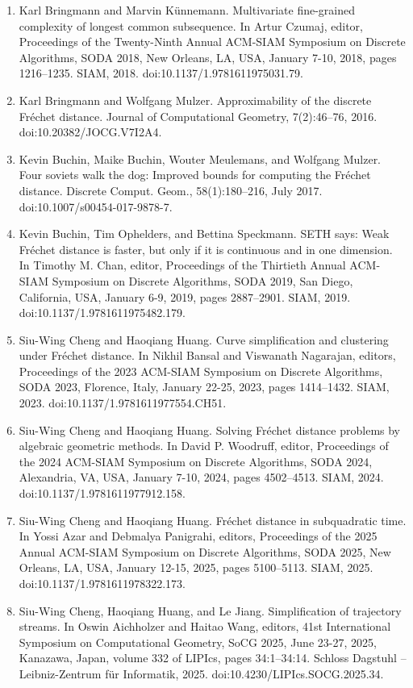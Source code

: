 \documentclass[10pt,a4paper]{article}
\begin{document}
\begin{enumerate}
\item[]  [9]  Karl Bringmann and Marvin Künnemann.  Multivariate fine-grained complexity of longest common subsequence.  In Artur Czumaj, editor, Proceedings of the Twenty-Ninth Annual ACM-SIAM Symposium on Discrete Algorithms, SODA 2018, New Orleans, LA, USA, January 7-10, 2018, pages 1216–1235. SIAM, 2018.  doi:10.1137/1.9781611975031.79.  
\item[]  [10]  Karl Bringmann and Wolfgang Mulzer.  Approximability of the discrete Fréchet distance.  Journal of Computational Geometry, 7(2):46–76, 2016.  doi:10.20382/JOCG.V7I2A4.  
\item[]  [11]  Kevin Buchin, Maike Buchin, Wouter Meulemans, and Wolfgang Mulzer.  Four soviets walk the dog: Improved bounds for computing the Fréchet distance.  Discrete Comput. Geom., 58(1):180–216, July 2017.  doi:10.1007/s00454-017-9878-7.  
\item[]  [12]  Kevin Buchin, Tim Ophelders, and Bettina Speckmann.  SETH says: Weak Fréchet distance is faster, but only if it is continuous and in one dimension.  In Timothy M. Chan, editor, Proceedings of the Thirtieth Annual ACM-SIAM Symposium on Discrete Algorithms, SODA 2019, San Diego, California, USA, January 6-9, 2019, pages 2887–2901. SIAM, 2019.  doi:10.1137/1.9781611975482.179.  
\item[]  [13]  Siu-Wing Cheng and Haoqiang Huang.  Curve simplification and clustering under Fréchet distance.  In Nikhil Bansal and Viswanath Nagarajan, editors, Proceedings of the 2023 ACM-SIAM Symposium on Discrete Algorithms, SODA 2023, Florence, Italy, January 22-25, 2023, pages 1414–1432. SIAM, 2023.  doi:10.1137/1.9781611977554.CH51.  
\item[]  [14]  Siu-Wing Cheng and Haoqiang Huang.  Solving Fréchet distance problems by algebraic geometric methods.  In David P. Woodruff, editor, Proceedings of the 2024 ACM-SIAM Symposium on Discrete Algorithms, SODA 2024, Alexandria, VA, USA, January 7-10, 2024, pages 4502–4513. SIAM, 2024.  doi:10.1137/1.9781611977912.158.  
\item[]  [15]  Siu-Wing Cheng and Haoqiang Huang.  Fréchet distance in subquadratic time.  In Yossi Azar and Debmalya Panigrahi, editors, Proceedings of the 2025 Annual ACM-SIAM Symposium on Discrete Algorithms, SODA 2025, New Orleans, LA, USA, January 12-15, 2025, pages 5100–5113. SIAM, 2025.  doi:10.1137/1.9781611978322.173.  
\item[]  [16]  Siu-Wing Cheng, Haoqiang Huang, and Le Jiang.  Simplification of trajectory streams.  In Oswin Aichholzer and Haitao Wang, editors, 41st International Symposium on Computational Geometry, SoCG 2025, June 23-27, 2025, Kanazawa, Japan, volume 332 of LIPIcs, pages 34:1–34:14. Schloss Dagstuhl – Leibniz-Zentrum für Informatik, 2025.  doi:10.4230/LIPIcs.SOCG.2025.34.  

\end{enumerate}
\end{document}
